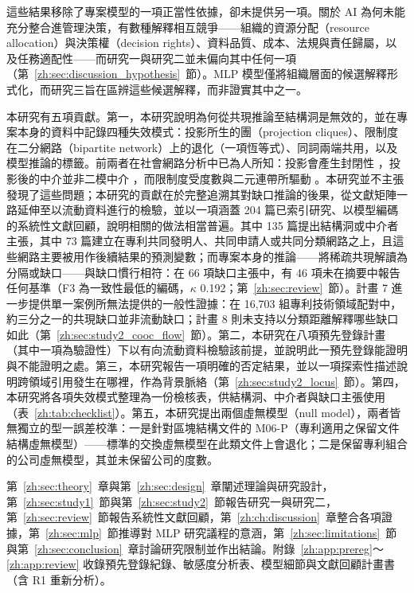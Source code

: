 這些結果移除了專案模型的一項正當性依據，卻未提供另一項。關於 AI 為何未能充分整合進管理決策，有數種解釋相互競爭——組織的資源分配（resource allocation）與決策權（decision rights）、資料品質、成本、法規與責任歸屬，以及任務適配性——而研究一與研究二並未偏向其中任何一項（第~\ref{zh:sec:discussion_hypothesis}~節）。MLP 模型僅將組織層面的候選解釋形式化，而研究三旨在區辨這些候選解釋，而非證實其中之一。

本研究有五項貢獻。第一，本研究說明為何從共現推論至結構洞是無效的，並在專案本身的資料中記錄四種失效模式：投影所生的團（projection cliques）、限制度在二分網路（bipartite network）上的退化（一項恆等式）、同詞兩端共用，以及模型推論的標籤。前兩者在社會網路分析中已為人所知：投影會產生封閉性 \citep{opsahl2013triadic}，投影後的中介並非二模中介 \citep{jasny2015two}，而限制度受度數與二元連帶所驅動 \citep{everett2020unpacking}。本研究並不主張發現了這些問題；本研究的貢獻在於完整追溯其對缺口推論的後果，從文獻矩陣一路延伸至以流動資料進行的檢驗，並以一項涵蓋 204 篇已索引研究、以模型編碼的系統性文獻回顧，說明相關的做法相當普遍。其中 135 篇提出結構洞或中介者主張，其中 73 篇建立在專利共同發明人、共同申請人或共同分類網路之上，且這些網路主要被用作後續結果的預測變數；而專案本身的推論——將稀疏共現解讀為分隔或缺口——與缺口慣行相符：在 66 項缺口主張中，有 46 項未在摘要中報告任何基準（F3 為一致性最低的編碼，$\kappa$ 0.192；第~\ref{zh:sec:review}~節）。計畫 7 進一步提供單一案例所無法提供的一般性證據：在 16,703 組專利技術領域配對中，約三分之一的共現缺口並非流動缺口；計畫 8 則未支持以分類距離解釋哪些缺口如此（第~\ref{zh:sec:study2_cooc_flow}~節）。第二，本研究在八項預先登錄計畫（其中一項為驗證性）下以有向流動資料檢驗該前提，並說明此一預先登錄能證明與不能證明之處。第三，本研究報告一項明確的否定結果，並以一項探索性描述說明跨領域引用發生在哪裡，作為背景脈絡（第~\ref{zh:sec:study2_locus}~節）。第四，本研究將各項失效模式整理為一份檢核表，供結構洞、中介者與缺口主張使用（表~\ref{zh:tab:checklist}）。第五，本研究提出兩個虛無模型（null model），兩者皆無獨立的型一誤差校準：一是針對區塊結構文件的 M06-P（專利適用之保留文件結構虛無模型）——標準的交換虛無模型在此類文件上會退化；二是保留專利組合的公司虛無模型，其並未保留公司的度數。

第~\ref{zh:sec:theory}~章與第~\ref{zh:sec:design}~章闡述理論與研究設計，第~\ref{zh:sec:study1}~節與第~\ref{zh:sec:study2}~節報告研究一與研究二，第~\ref{zh:sec:review}~節報告系統性文獻回顧，第~\ref{zh:ch:discussion}~章整合各項證據，第~\ref{zh:sec:mlp}~節推導對 MLP 研究議程的意涵，第~\ref{zh:sec:limitations}~節與第~\ref{zh:sec:conclusion}~章討論研究限制並作出結論。附錄~\ref{zh:app:prereg}～\ref{zh:app:review} 收錄預先登錄紀錄、敏感度分析表、模型細節與文獻回顧計畫書（含 R1 重新分析）。
